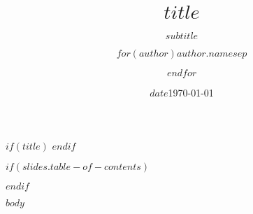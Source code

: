 \documentclass[aspectratio=$if(slides.aspect-ratio)$$slides.aspect-ratio$$else$169$endif$,$if(slides.font-size)$$slides.font-size$$else$10pt$endif$]{beamer}
\title{$title$}
\subtitle{$subtitle$}
\date{$date$}
\date{\today}
\author{$for(author)$$author.name$$sep$ \and $endfor$}
\institute{$institute$}
\begin{document}
$if(title)$
\frame{\titlepage}
$endif$

$if(slides.table-of-contents)$
\begin{frame}
    \tableofcontents
\end{frame}
$endif$

$body$
\end{document}
